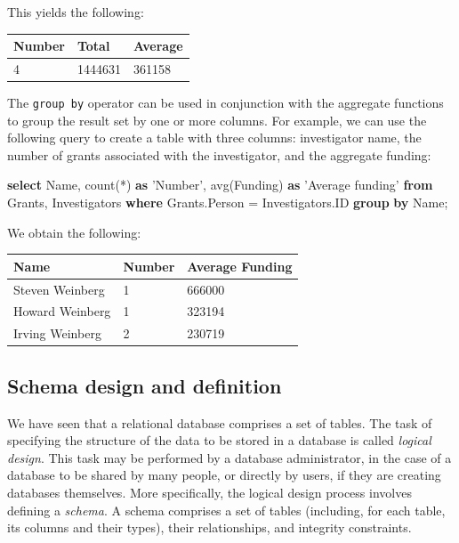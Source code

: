 \documentclass[]{krantz}
\newenvironment{Shaded}{\begin{snugshade}}{\end{snugshade}}
\newcommand{\KeywordTok}[1]{\textcolor[rgb]{0.13,0.29,0.53}{\textbf{#1}}}
\newcommand{\StringTok}[1]{\textcolor[rgb]{0.31,0.60,0.02}{#1}}
\newcommand{\FunctionTok}[1]{\textcolor[rgb]{0.00,0.00,0.00}{#1}}
\newcommand{\NormalTok}[1]{#1}
\begin{document}
This yields the following:

\begin{longtable}[]{@{}lll@{}}
\toprule
\textbf{Number} & \textbf{Total} & \textbf{Average}\tabularnewline
\midrule
\endhead
4 & 1444631 & 361158\tabularnewline
\bottomrule
\end{longtable}

The \texttt{group\ by} operator can be used in conjunction with the
aggregate functions to group the result set by one or more columns. For
example, we can use the following query to create a table with three
columns: investigator name, the number of grants associated with the
investigator, and the aggregate funding:

\begin{Shaded}
\begin{Highlighting}[]
\KeywordTok{select}\NormalTok{ Name, }\FunctionTok{count}\NormalTok{(*) }\KeywordTok{as} \StringTok{'Number'}\NormalTok{,}
       \FunctionTok{avg}\NormalTok{(Funding) }\KeywordTok{as} \StringTok{'Average funding'}
\KeywordTok{from}\NormalTok{ Grants, Investigators}
\KeywordTok{where}\NormalTok{ Grants.Person = Investigators.ID}
\KeywordTok{group} \KeywordTok{by}\NormalTok{ Name;}
\end{Highlighting}
\end{Shaded}

We obtain the following:

\begin{longtable}[]{@{}lll@{}}
\toprule
\textbf{Name} & \textbf{Number} & \textbf{Average
Funding}\tabularnewline
\midrule
\endhead
Steven Weinberg & 1 & 666000\tabularnewline
Howard Weinberg & 1 & 323194\tabularnewline
Irving Weinberg & 2 & 230719\tabularnewline
\bottomrule
\end{longtable}

\hypertarget{sec:db:schema}{\subsection{Schema design and
definition}\label{sec:db:schema}}

We have seen that a relational database comprises a set of tables. The
task of specifying the structure of the data to be stored in a database
is called \emph{logical design}. This task may be performed by a
database administrator, in the case of a database to be shared by many
people, or directly by users, if they are creating databases themselves.
More specifically, the logical design process involves defining a
\emph{schema}. A schema comprises a set of tables (including, for each
table, its columns and their types), their relationships, and integrity
constraints.
\end{document}
